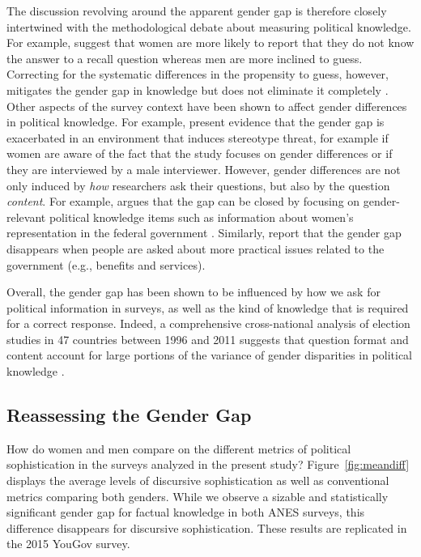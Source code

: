 The discussion revolving around the apparent gender gap is therefore closely intertwined with the methodological debate about measuring political knowledge. For example, \citet{mondak2004knowledge} suggest that women are more likely to report that they do not know the answer to a recall question whereas men are more inclined to guess. Correcting for the systematic differences in the propensity to guess, however, mitigates the gender gap in knowledge but does not eliminate it completely \citep[see also][]{lizotte2009explaining}. Other aspects of the survey context have been shown to affect gender differences in political knowledge. For example, \citet{mcglone2006stereotype} present evidence that the gender gap is exacerbated in an environment that induces stereotype threat, for example if women are aware of the fact that the study focuses on gender differences or if they are interviewed by a male interviewer. However, gender differences are not only induced by \textit{how} researchers ask their questions, but also by the question \textit{content}. For example, \citet{dolan2011women} argues that the gap can be closed by focusing on gender-relevant political knowledge items such as information about women's representation in the federal government \citep[see also][]{graber2001processing,fraile2014does,jerit2017revisiting}. Similarly, \citet{stolle2010women} report that the gender gap disappears when people are asked about more practical issues related to the government (e.g., benefits and services).

Overall, the gender gap has been shown to be influenced by how we ask for political information in surveys, as well as the kind of knowledge that is required for a correct response. Indeed, a comprehensive cross-national analysis of election studies in 47 countries between 1996 and 2011 suggests that question format and content account for large portions of the variance of gender disparities in political knowledge \citep{fortin2016cross}.


\subsection*{Reassessing the Gender Gap}
How do women and men compare on the different metrics of political sophistication in the surveys analyzed in the present study? Figure~\ref{fig:meandiff} displays the average levels of discursive sophistication as well as conventional metrics comparing both genders. While we observe a sizable and statistically significant gender gap for factual knowledge in both ANES surveys, this difference disappears for discursive sophistication. These results are replicated in the 2015 YouGov survey. 

